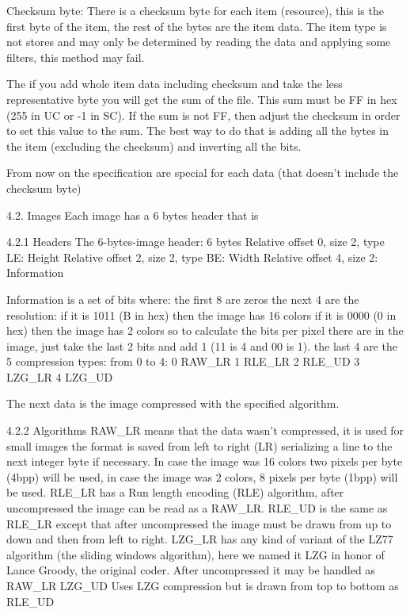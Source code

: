  Checksum byte:
 There is a checksum byte for each item (resource), this is the first byte
 of the item, the rest of the bytes are the item data. The item type is not
 stores and may only be determined by reading the data and applying some
 filters, this method may fail.

 The if you add whole item data including checksum and take the less
 representative byte you will get the sum of the file. This sum must be FF
 in hex (255 in UC or -1 in SC). If the sum is not FF, then adjust the
 checksum in order to set this value to the sum. The best way to do that is
 adding all the bytes in the item (excluding the checksum) and inverting
 all the bits.

 From now on the specification are special for each data (that doesn't
 include the checksum byte)

4.2. Images
 Each image has a 6 bytes header that is

4.2.1 Headers
 The 6-bytes-image header: 6 bytes
  Relative offset 0, size 2, type LE: Height
  Relative offset 2, size 2, type BE: Width 
  Relative offset 4, size 2: Information

 Information is a set of bits where:
  the first 8 are zeros
  the next 4 are the resolution:
   if it is 1011 (B in hex) then the image has 16 colors
   if it is 0000 (0 in hex) then the image has 2 colors
   so to calculate the bits per pixel there are in the image, just take the
   last 2 bits and add 1 (11 is 4 and 00 is 1).
  the last 4 are the 5 compression types:
   from 0 to 4:
   0 RAW_LR
   1 RLE_LR
   2 RLE_UD
   3 LZG_LR
   4 LZG_UD

 The next data is the image compressed with the specified algorithm.

4.2.2 Algorithms
 RAW_LR means that the data wasn't compressed, it is used for small images
        the format is saved from left to right (LR) serializing a line to
        the next integer byte if necessary. In case the image was 16 colors
	two pixels per byte (4bpp) will be used, in case the image was 2
	colors, 8 pixels per byte (1bpp) will be used.
 RLE_LR has a Run length encoding (RLE) algorithm, after uncompressed the
        image can be read as a RAW_LR.
 RLE_UD is the same as RLE_LR except that after uncompressed the image must
        be drawn from up to down and then from left to right.
 LZG_LR has any kind of variant of the LZ77 algorithm (the sliding windows
        algorithm), here we named it LZG in honor of Lance Groody, the
        original coder.
        After uncompressed it may be handled as RAW_LR
 LZG_UD Uses LZG compression but is drawn from top to bottom as RLE_UD

